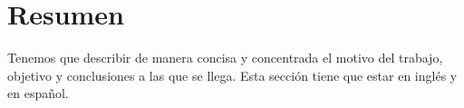 \section{Resumen}
Tenemos que describir de manera concisa y concentrada el motivo del trabajo, objetivo y conclusiones a las que se llega.
Esta sección tiene que estar en inglés y en español.
\newpage
